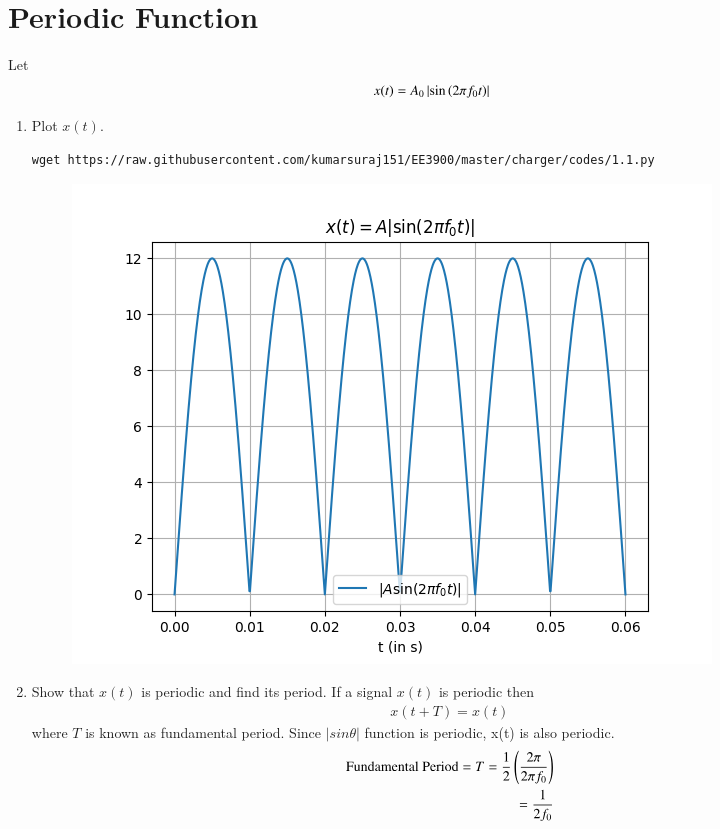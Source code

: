\documentclass[journal,12pt,twocolumn]{IEEEtran}
\renewcommand\thesection{\arabic{section}}
\begin{document}
\section{Periodic Function}
Let 
\begin{align}
	x(t) &= A_0\left\vert\sin\left(2\pi f_0 t\right)\right\vert
	\label{eq:10-orig-diff-def}
\end{align}
\begin{enumerate}[label=\thesection.\arabic*
,ref=\thesection.\theenumi]
\item Plot $x(t)$.\\
\solution 
\begin{lstlisting}
wget https://raw.githubusercontent.com/kumarsuraj151/EE3900/master/charger/codes/1.1.py

\end{lstlisting}
\begin{figure}[!ht]
	\centering
	\includegraphics[width=\columnwidth]{./figs/1.1}
	\caption{}
\end{figure}
\item Show that $x(t)$ is periodic and find its period.
\solution 
    If a signal $x(t)$ is periodic then
    \begin{align}
    x(t+T)=x(t)
    \end{align}
    where $T$ is known as fundamental period.
    \indent Since $|sin\theta|$ function is periodic, x(t) is also periodic.
    \begin{align}
\text{Fundamental Period}=T=\frac{1}{2}\left(\frac{2 \pi}{2 \pi f_0}\right)\\
\label{eq:ftp}
=\frac{1}{2f_0}
    \end{align}
\end{enumerate}
\end{document}
